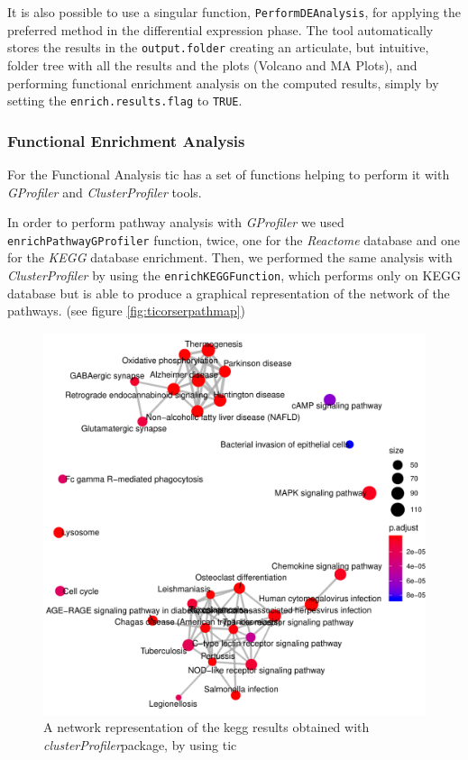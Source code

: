 It is also possible to use a singular function, \lstinline!PerformDEAnalysis!, for applying the preferred method in the differential expression phase. 
The tool automatically stores the results in the \lstinline!output.folder! creating an articulate, but intuitive, folder tree with all the results and the plots (Volcano and MA Plots), and performing functional enrichment analysis on the computed results, simply by setting the \lstinline!enrich.results.flag! to \lstinline!TRUE!.

\subsubsection{Functional Enrichment Analysis}

For the Functional Analysis \gls{tic} has a set of functions helping to perform it with \textit{GProfiler} and \textit{ClusterProfiler} tools.

In order to perform pathway analysis with \textit{GProfiler} we used \lstinline!enrichPathwayGProfiler! function, twice, one for the \textit{Reactome} database and one for the \textit{KEGG} database enrichment.
Then, we performed the same analysis with \textit{ClusterProfiler} by using the \lstinline!enrichKEGGFunction!, which performs only on KEGG database but is able to produce a graphical representation of the network of the pathways. (see figure \ref{fig:ticorserpathmap})

\begin{figure}[H]
\centering
\includegraphics[width=\textwidth, keepaspectratio]{img/ticorser/functional/net_kegg.pdf}
\caption[ticorser pathway network]{A network representation of the kegg results obtained with \textit{clusterProfiler}package, by using \gls{tic}}
\label{fig:ticorserpathmat}
\end{figure}


